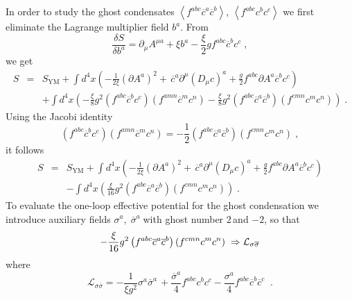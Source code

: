 \documentclass[a4paper,12pt]{article}
\begin{document}
In order to study the ghost condensates $\left\langle f^{abc}\overline{c}^{a}%
\overline{c}^{b}\right\rangle $, $\left\langle
f^{abc}c^{b}c^{c}\right\rangle $ we first eliminate the Lagrange multiplier
field $b^{a}$. From 
\begin{equation}
\frac{\delta S}{\delta b^{a}}=\partial _{\mu }A^{\mu a}+\xi b^{a}-\frac{\xi 
}{2}gf^{abc}\overline{c}^{b}c^{c}\;,  \label{beq}
\end{equation}
we get 
\begin{eqnarray}
S &=&S_{\mathrm{YM}}+\int d^{4}x\left( -\frac{1}{2\xi }\left( \partial
A^{a}\right) ^{2}+\,\overline{c}^{a}\partial ^{\mu }\left( D_{\mu }c\right)
^{a}+\frac{g}{2}f^{abc}\partial A^{a}\overline{c}^{b}c^{c}\right) 
\label{be} \\
&&+\int d^{4}x\left( -\frac{\xi }{8}g^{2}\left( f^{abc}\overline{c}%
^{b}c^{c}\right) \left( f^{amn}\overline{c}^{m}c^{n}\right) -\frac{\xi }{8}%
g^{2}\left( f^{abc}\overline{c}^{a}\overline{c}^{b}\right) \left(
f^{cmn}c^{m}c^{n}\right) \right) \;.  \nonumber
\end{eqnarray}
Using the Jacobi identity 
\begin{equation}
\left( f^{abc}\overline{c}^{b}c^{c}\right) \left( f^{amn}\overline{c}%
^{m}c^{n}\right) =-\frac{1}{2}\left( f^{abc}\overline{c}^{a}\overline{c}%
^{b}\right) \left( f^{cmn}c^{m}c^{n}\right) \;,  \label{jac}
\end{equation}
it follows 
\begin{eqnarray}
S &=&S_{\mathrm{YM}}+\int d^{4}x\left( -\frac{1}{2\xi }\left( \partial
A^{a}\right) ^{2}+\,\overline{c}^{a}\partial ^{\mu }\left( D_{\mu }c\right)
^{a}+\frac{g}{2}f^{abc}\partial A^{a}\overline{c}^{b}c^{c}\right)   \nonumber
\\
&&-\int d^{4}x\left( \frac{\xi }{16}g^{2}\left( f^{abc}\overline{c}^{a}%
\overline{c}^{b}\right) \left( f^{cmn}c^{m}c^{n}\right) \right) \;.
\label{bef}
\end{eqnarray}
To evaluate the one-loop effective potential for the ghost condensation we
introduce auxiliary fields $\sigma ^{a},\;\overline{\sigma }^{a}\;$with
ghost number $2\,$and $-2$, so that 
\begin{equation}
-\frac{\xi }{16}g^{2}\left( f^{abc}\overline{c}^{a}\overline{c}^{b}\right)
\left( f^{cmn}c^{m}c^{n}\right) \;\Rightarrow \mathcal{L}_{\sigma \overline{%
\sigma }}  \label{hbs}
\end{equation}
where 
\begin{equation}
\mathcal{L}_{\sigma \overline{\sigma }}=-\frac{1}{\xi g^{2}}\sigma ^{a}%
\overline{\sigma }^{a}\,+\frac{\overline{\sigma }^{a}}{4}f^{abc}c^{b}c^{c}-%
\frac{\sigma ^{a}}{4}f^{abc}\overline{c}^{b}\overline{c}^{c}\;\;.
\label{cfls}
\end{equation}
\end{document}
